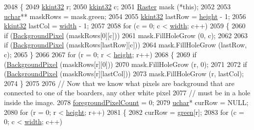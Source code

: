 \begin{DoxyCode}
2048 \{
2049   \hyperlink{namespace_k_k_b_a8fa4952cc84fda1de4bec1fbdd8d5b1b}{kkint32}  r;
2050   \hyperlink{namespace_k_k_b_a8fa4952cc84fda1de4bec1fbdd8d5b1b}{kkint32}  c;
2051   \hyperlink{class_k_k_b_1_1_raster}{Raster}  mask (*\textcolor{keyword}{this});
2052 
2053   \hyperlink{namespace_k_k_b_ace9969169bf514f9ee6185186949cdf7}{uchar}**  maskRows = mask.green;
2054 
2055   \hyperlink{namespace_k_k_b_a8fa4952cc84fda1de4bec1fbdd8d5b1b}{kkint32}  lastRow = \hyperlink{class_k_k_b_1_1_raster_af39ff189de4fbb6de98392e187efafb7}{height} - 1;
2056   \hyperlink{namespace_k_k_b_a8fa4952cc84fda1de4bec1fbdd8d5b1b}{kkint32}  lastCol = \hyperlink{class_k_k_b_1_1_raster_ae0bcc103e191c3421d7692dc69ceb554}{width}  - 1;
2057 
2058   \textcolor{keywordflow}{for}  (c = 0; c < \hyperlink{class_k_k_b_1_1_raster_ae0bcc103e191c3421d7692dc69ceb554}{width}; c++)
2059   \{
2060     \textcolor{keywordflow}{if}  (\hyperlink{class_k_k_b_1_1_raster_a0756fb5530274d5e28858d3e1633d595}{BackgroundPixel} (maskRows[0][c]))
2061       mask.FillHoleGrow (0, c);
2062 
2063     \textcolor{keywordflow}{if}  (\hyperlink{class_k_k_b_1_1_raster_a0756fb5530274d5e28858d3e1633d595}{BackgroundPixel} (maskRows[lastRow][c]))
2064       mask.FillHoleGrow (lastRow, c);
2065   \}
2066 
2067   \textcolor{keywordflow}{for}  (r = 0; r < \hyperlink{class_k_k_b_1_1_raster_af39ff189de4fbb6de98392e187efafb7}{height}; r++)     
2068   \{
2069     \textcolor{keywordflow}{if}  (\hyperlink{class_k_k_b_1_1_raster_a0756fb5530274d5e28858d3e1633d595}{BackgroundPixel} (maskRows[r][0]))
2070       mask.FillHoleGrow (r, 0);
2071 
2072     \textcolor{keywordflow}{if}  (\hyperlink{class_k_k_b_1_1_raster_a0756fb5530274d5e28858d3e1633d595}{BackgroundPixel} (maskRows[r][lastCol]))
2073       mask.FillHoleGrow (r, lastCol);
2074   \}
2075 
2076   \textcolor{comment}{// Now that we know what pixels are background that are connected to one of the boarders,  any other
       white pixel}
2077   \textcolor{comment}{// must be in a hole inside the image.}
2078   \hyperlink{class_k_k_b_1_1_raster_aa7e86253f4b9c347da718732e44b60e8}{foregroundPixelCount} = 0;
2079   \hyperlink{namespace_k_k_b_ace9969169bf514f9ee6185186949cdf7}{uchar}*  curRow = NULL;
2080   \textcolor{keywordflow}{for}  (r = 0; r < \hyperlink{class_k_k_b_1_1_raster_af39ff189de4fbb6de98392e187efafb7}{height}; r++)
2081   \{
2082     curRow = \hyperlink{class_k_k_b_1_1_raster_a2d2238911145488e226cd2e34fc8448c}{green}[r];
2083     \textcolor{keywordflow}{for}  (c = 0; c < \hyperlink{class_k_k_b_1_1_raster_ae0bcc103e191c3421d7692dc69ceb554}{width}; c++)

\end{DoxyCode}
